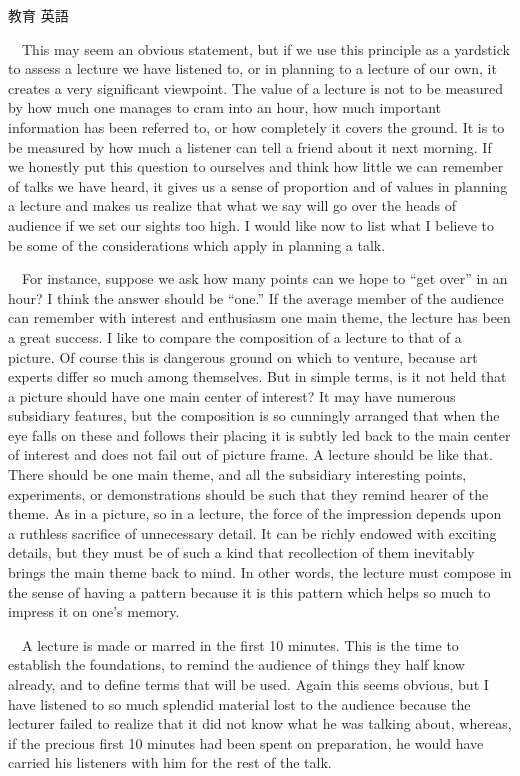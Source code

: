 \documentclass[fleqn]{jbook}
\begin{document}
\begin{question}{教育 英語}{}
\begin{subquestions}
　This may seem an obvious statement, but if we use this principle as a yardstick to assess a lecture we have listened to, or in planning to a lecture of our own, it creates a very significant viewpoint. The value of a lecture is not to be measured by how much one manages to cram into an hour, how much important information has been referred to, or how completely it covers the ground. It is to be measured by how much a listener can tell a friend about it next morning. If we honestly put this question to ourselves and think how little we can remember of talks we have heard, it gives us a sense of proportion and of values in planning a lecture and makes us realize that what we say will go over the heads of audience if we set our sights too high. I would like now to list what I believe to be some of the considerations which apply in planning a talk.

　For instance, suppose we ask how many points can we hope to ``get over'' in an hour? I think the answer should be ``one.'' If the average member of the audience can remember with interest and enthusiasm one main theme, the lecture has been a great success. I like to compare the composition of a lecture to that of a picture. Of course this is dangerous ground on which to venture, because art experts differ so much among themselves. But in simple terms, is it not held that a picture should have one main center of interest? It may have numerous subsidiary features, but the composition is so cunningly arranged that when the eye falls on these and follows their placing it is subtly led back to the main center of interest and does not fail out of picture frame. A lecture should be like that. There should be one main theme, and all the subsidiary interesting points, experiments, or demonstrations should be such that they remind hearer of the theme. As in a picture, so in a lecture, the force of the impression depends upon a ruthless sacrifice of unnecessary detail. It can be richly endowed with exciting details, but they must be of such a kind that recollection of them inevitably brings the main theme back to mind. In other words, the lecture must compose in the sense of having a pattern because it is this pattern which helps so much to impress it on one's memory.

　A lecture is made or marred in the first 10 minutes. This is the time to establish the foundations, to remind the audience of things they half know already, and to define terms that will be used. Again this seems obvious, but I have listened to so much splendid material lost to the audience because the lecturer failed to realize that it did not know what he was talking about, whereas, if the precious first 10 minutes had been spent on preparation, he would have carried his listeners with him for the rest of the talk.\\


\end{subquestions}
\end{question}
\end{document}
